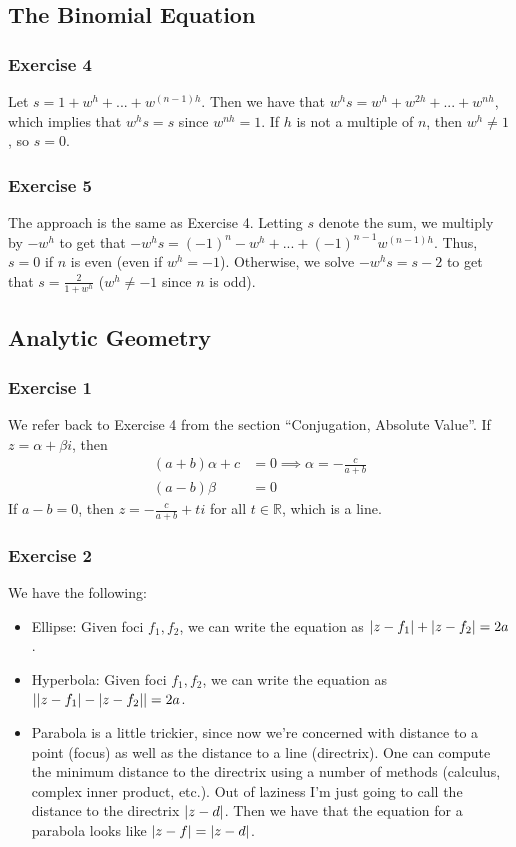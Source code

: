 \subsection{The Binomial Equation}

\subsubsection{Exercise 4}
Let $s = 1 + w^h + ... + w^{(n - 1)h}$. Then we have that $w^h s = w^h + w^{2h} + ... + w^{nh}$, which implies
that $w^h s = s$ since $w^{nh} = 1$. If $h$ is not a multiple of $n$, then $w^h \neq 1$, so $s = 0$.

\subsubsection{Exercise 5}
The approach is the same as Exercise 4. Letting $s$ denote the sum, we multiply by $-w^h$ to get that
$-w^h s = (-1)^n - w^h + ... + (-1)^{n - 1} w^{(n - 1)h}$. Thus, $s = 0$ if $n$ is even (even if $w^h = -1$).
Otherwise, we solve $-w^h s = s - 2$ to get that $s = \frac{2}{1 + w^h}$ ($w^h \neq -1$ since $n$ is odd).

\subsection{Analytic Geometry}

\subsubsection{Exercise 1}
We refer back to Exercise 4 from the section ``Conjugation, Absolute Value''. If $z = \alpha + \beta i$, then
\begin{align*}
        (a + b) \alpha + c &= 0 \implies \alpha = -\frac{c}{a + b}\\
        (a - b) \beta &= 0
\end{align*}
If $a - b = 0$, then $z = -\frac{c}{a + b} + ti$ for all $t \in \mathbb{R}$, which is a line.

\subsubsection{Exercise 2}
We have the following:
\begin{itemize}
        \item Ellipse: Given foci $f_1, f_2$, we can write the equation as $\abs{z - f_1} + \abs{z - f_2} = 2a$.
        \item Hyperbola: Given foci $f_1, f_2$, we can write the equation as
                $\abs{\abs{z - f_1} - \abs{z - f_2}} = 2a$.
        \item Parabola is a little trickier, since now we're concerned with distance to a point (focus) as
                well as the distance to a line (directrix). One can compute the minimum distance to the
                directrix using a number of methods (calculus, complex inner product, etc.). Out of laziness
                I'm just going to call the distance to the directrix $\abs{z - d}$. Then we have that the
                equation for a parabola looks like $\abs{z - f} = \abs{z - d}$.
\end{itemize}

